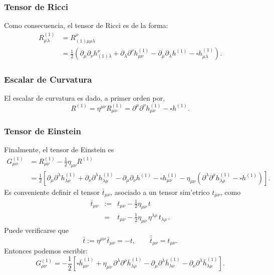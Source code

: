 \subsubsection{Tensor de Ricci}

Como consecuencia, el tensor de Ricci es de la forma:
\begin{align}
R^{(1)}_{\mu\lambda}&=R^\rho_{(1)\mu\rho\lambda} \\
&=\frac{1}{2}\left(\partial_\mu\partial_\nu h^\nu_{(1)\lambda}
 + \partial_\lambda \partial^\nu h^{(1)}_{\mu\nu}- \partial_\mu\partial_\lambda h^{(1)} -\square h^{(1)}_{\mu\lambda}\right).
\end{align}




\subsubsection{Escalar de Curvatura}

El escalar de curvatura es dado, a primer orden por,
\begin{equation}\label{R1}
R^{(1)}=\eta^{\mu\nu}R^{(1)}_{\mu\nu}=\partial^\mu\partial^\nu h^{(1)}_{\mu\nu} - \square h^{(1)} .
\end{equation}


\subsubsection{Tensor de Einstein}

Finalmente, el tensor de Einstein es
\begin{align}
G^{(1)}_{\mu\nu} &= R^{(1)}_{\mu\nu}-\frac{1}{2}\eta_{\mu\nu}R^{(1)}\\
&= \frac{1}{2}\left[\partial_\mu\partial^\lambda h^{(1)}_{\lambda\nu} +\partial_\nu\partial^\lambda h^{(1)}_{\lambda\mu} - \partial_\mu\partial_\nu h^{(1)} -\square h^{(1)}_{\mu\nu} -\eta_{\mu\nu}\left(\partial^\lambda \partial^\rho h^{(1)}_{\lambda\rho} - \square h^{(1)}\right) \right].
\end{align}
Es conveniente definir el tensor $\bar{t}_{\mu\nu}$, asociado a un
tensor sim'etrico $t_{\mu\nu}$, como
\begin{eqnarray}
\bar{t}_{\mu\nu}&:=&t_{\mu\nu}-\frac{1}2\eta_{\mu\nu}\, t \label{tbarra}\\
&=&t_{\mu\nu}-\frac{1}2\eta_{\mu\nu}\, \eta^{\lambda\rho}\, t_{\lambda\rho} \, .
\end{eqnarray}
Puede verificarse que 
\begin{equation}
\bar{t}:= \eta^{\mu\nu}\,\bar{t}_{\mu\nu}=-t, \qquad 
\bar{\bar{t}}_{\mu\nu}=t_{\mu\nu}.
\end{equation}
Entonces podemos escribir:
\begin{equation}
G^{(1)}_{\mu\nu} =-\frac{1}{2}\left[\square \bar{h}^{(1)}_{\mu\nu}
+\eta_{\mu\nu}\, \partial^\lambda\partial^\rho\bar{h}^{(1)}_{\lambda\rho}-
\partial_\mu\partial^\lambda\bar{h}^{(1)}_{\lambda\nu}
- \partial_\nu\partial^\lambda \bar{h}^{(1)}_{\lambda\mu}\right].
\end{equation}

